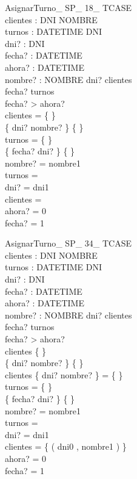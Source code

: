 \documentclass[%
  fleqn,colorlinks,linkcolor=blue,citecolor=blue,urlcolor=blue]{eptcs}
\begin{document}
\begin{schema}{AsignarTurno\_ SP\_ 18\_ TCASE}\\
 clientes : DNI \pfun NOMBRE \\
 turnos : DATETIME \pfun DNI \\
 dni? : DNI \\
 fecha? : DATETIME \\
 ahora? : DATETIME \\
 nombre? : NOMBRE
\where
 dni? \notin \dom clientes \\
 fecha? \notin \dom turnos \\
 fecha? > ahora? \\
 clientes = \{ \} \\
 \{ dni? \mapsto nombre? \} \neq \{ \} \\
 turnos = \{ \} \\
 \{ fecha? \mapsto dni? \} \neq \{ \} \\
 nombre? = nombre1 \\
 turnos =~\emptyset \\
 dni? = dni1 \\
 clientes =~\emptyset \\
 ahora? = 0 \\
 fecha? = 1
\end{schema}


\begin{schema}{AsignarTurno\_ SP\_ 34\_ TCASE}\\
 clientes : DNI \pfun NOMBRE \\
 turnos : DATETIME \pfun DNI \\
 dni? : DNI \\
 fecha? : DATETIME \\
 ahora? : DATETIME \\
 nombre? : NOMBRE
\where
 dni? \notin \dom clientes \\
 fecha? \notin \dom turnos \\
 fecha? > ahora? \\
 clientes \neq \{ \} \\
 \{ dni? \mapsto nombre? \} \neq \{ \} \\
 clientes \cap \{ dni? \mapsto nombre? \} = \{ \} \\
 turnos = \{ \} \\
 \{ fecha? \mapsto dni? \} \neq \{ \} \\
 nombre? = nombre1 \\
 turnos =~\emptyset \\
 dni? = dni1 \\
 clientes = \{ ( dni0 , nombre1 ) \} \\
 ahora? = 0 \\
 fecha? = 1
\end{schema}
\end{document}
